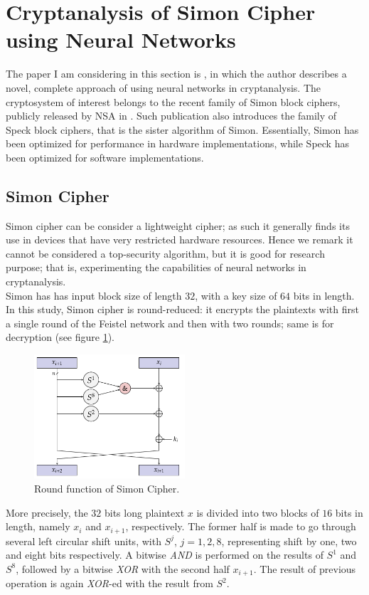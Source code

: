 \documentclass[%
    corpo=11pt,
    twoside,
    stile=classica,
    oldstyle,
    autoretitolo,
    tipotesi=magistrale,
    greek,
    evenboxes,
    english
]{toptesi}
\begin{document}
\section{Cryptanalysis of Simon Cipher using Neural Networks}
The paper I am considering in this section is \cite{jay}, in which the author describes a novel, complete approach of using neural networks in cryptanalysis. The cryptosystem of interest belongs to the recent family of Simon block ciphers, publicly released by NSA in \cite{nsa}. Such publication also introduces the family of Speck block ciphers, that is the sister algorithm of Simon. Essentially, Simon has been optimized for performance in hardware implementations, while Speck has been optimized for software implementations.
\subsection{Simon Cipher}
Simon cipher can be consider a lightweight cipher; as such it generally finds its use in devices that have very restricted hardware resources. Hence we remark it cannot be considered a top-security algorithm, but it is good for research purpose; that is, experimenting the capabilities of neural networks in cryptanalysis. \\
Simon has has input block size of length $32$, with a key size of $64$ bits in length. In this study, Simon cipher is round-reduced: it encrypts the plaintexts with first a single round of the Feistel network and then with two rounds; same is for decryption (see figure \ref{fig:simon}).
\begin{figure}[h]
\centering
\includegraphics[width=0.5\textwidth]{pictures/simon.png}
\caption{Round function of Simon Cipher.}
\label{fig:simon}
\end{figure}
More precisely, the $32$ bits long plaintext $x$ is divided into two blocks of $16$ bits in length, namely $x_i$ and $x_{i+1}$, respectively. The former half is made to go through several left circular shift units, with $S^j$, $j = 1,2,8$, representing shift by one, two and eight bits respectively. A bitwise \textit{AND} is performed on the results of $S^1$ and $S^8$, followed by a bitwise \textit{XOR} with the second half $x_{i+1}$. The result of previous operation is again \textit{XOR}-ed with the result from $S^2$. \\
\end{document}
